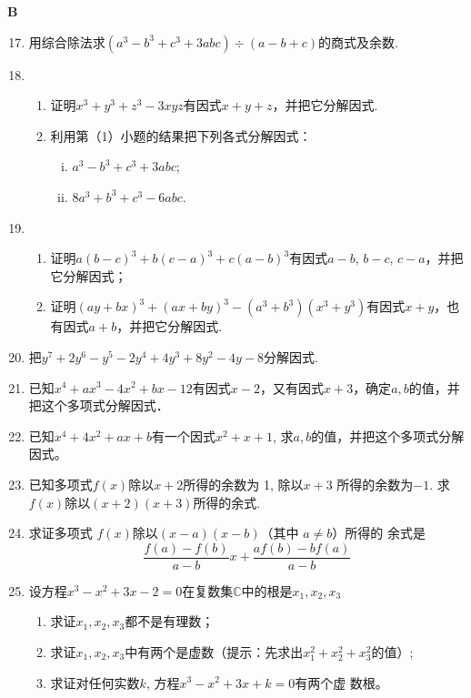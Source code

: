 \begin{center}
    \bfseries B
\end{center}
\begin{enumerate}\setcounter{enumi}{16}
\item 用综合除法求$(a^3-b^3+c^3+3abc)\div (a-b+c)$的商式及余数.
\item \begin{enumerate}[(1)]
\item 证明$x^3+y^3+z^3-3xyz$有因式$x+y+z$，并把它分解因式.
\item 利用第（1）小题的结果把下列各式分解因式：
\begin{enumerate}[(i)]
    \item $a^3-b^3+c^3+3abc$;
    \item $8a^3+b^3+c^3-6abc$.
\end{enumerate}
\end{enumerate}

\item \begin{enumerate}[(1)]
\item 证明$a(b-c)^3+b(c-a)^3+c(a-b)^3$有因式$a-b$, $b-c$, $c-a$，并把它分解因式；
\item 证明$(ay+bx)^3+(ax+by)^3-(a^3+b^3)(x^3+y^3)$有因式$x+y$，也有因式$a+b$，并把它分解因式.
\end{enumerate} 

\item 把$y^7+2y^6-y^5-2y^4+4y^3+8y^2-4y-8$分解因式.
\item 已知$x^4+ax^3-4x^2+bx-12$有因式$x-2$，又有因式$x+3$，确定$a,b$的值，并把这个多项式分解因式．

\item 已知$x^4+4x^{2}+ax+b$有一个因式$x^2+x+1$, 求$ a,b$的值，并把这个多项式分解因式。
\item 已知多项式$f(x)$除以$x+2$所得的余数为 1, 除以$x+3$ 所得的余数为$-1$. 求 $f(x)$除以$(x+2)(x+3)$所得的余式.
\item 求证多项式 $f(x)$除以$(x-a)(x-b)$（其中 $a\neq b$）所得的
余式是
$$\frac{f(a)-f(b)}{a-b}x+\frac{af(b)-bf(a)}{a-b}$$
\item 设方程$x^3-x^2+3x-2=0$在复数集$\mathbb{C}$中的根是$x_1,x_2,x_3$
\begin{enumerate}[(1)]
\item 求证$x_{1},x_{2},x_{3}$都不是有理数；
\item 求证$x_{1},x_{2},x_{3}$中有两个是虚数（提示：先求出$x_1^{2}+x_{2}^{2}+x_3^2$的值）;
\item 求证对任何实数$k$, 方程$x^3-x^2+3x+k=0$有两个虚
数根。
\end{enumerate}



\end{enumerate}
